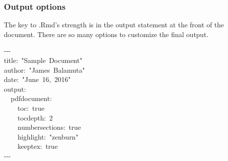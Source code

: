 \documentclass{beamer}\usepackage[]{graphicx}\usepackage[]{color}
\makeatletter
\newcommand{\hlnum}[1]{\textcolor[rgb]{0.686,0.059,0.569}{#1}}%
\newcommand{\hlstr}[1]{\textcolor[rgb]{0.192,0.494,0.8}{#1}}%
\newcommand{\hlopt}[1]{\textcolor[rgb]{0,0,0}{#1}}%
\newcommand{\hlstd}[1]{\textcolor[rgb]{0.345,0.345,0.345}{#1}}%
\newcommand{\hlkwc}[1]{\textcolor[rgb]{0.333,0.667,0.333}{#1}}%
\newenvironment{kframe}{%
 \def\at@end@of@kframe{}%
 \ifinner\ifhmode%
  \def\at@end@of@kframe{\end{minipage}}%
  \begin{minipage}{\columnwidth}%
 \fi\fi%
 \def\FrameCommand##1{\hskip\@totalleftmargin \hskip-\fboxsep
 \colorbox{shadecolor}{##1}\hskip-\fboxsep
     \hskip-\linewidth \hskip-\@totalleftmargin \hskip\columnwidth}%
 \MakeFramed {\advance\hsize-\width
   \@totalleftmargin\z@ \linewidth\hsize
   \@setminipage}}%
 {\par\unskip\endMakeFramed%
 \at@end@of@kframe}
\newenvironment{knitrout}{}{} %
\makeatother
\begin{document}
\begin{frame}[fragile]
\frametitle{Output options}
The key to .Rmd's strength is in the output statement  at the front of the document.
There are so many options to customize the final output. 
\begin{knitrout}
\color{fgcolor}\begin{kframe}
\noindent
\ttfamily
\hlstd{}\hlopt{{-}{-}{-}}\hspace*{\fill}\\
\hlstd{title}\hlopt{:\ }\hlstd{}\hlstr{"Sample\ Document"}\hlstd{\hspace*{\fill}\\
author}\hlopt{:\ }\hlstd{}\hlstr{"James\ Balamuta"}\hlstd{}\hspace*{\fill}\\
\hlkwc{date}\hlstd{}\hlopt{:\ }\hlstd{}\hlstr{"June\ 16,\ 2016"}\hlstd{\hspace*{\fill}\\
output}\hlopt{:}\hspace*{\fill}\\
\hlstd{}\hlstd{\ \ }\hlstd{pdf\textunderscore document}\hlopt{:}\hspace*{\fill}\\
\hlstd{}\hlstd{\ \ \ \ }\hlstd{toc}\hlopt{:\ }\hlstd{true}\hlstd{\ \ \ \ \ \ \ \ \ \ \ \ \ }\hlstd{}\hspace*{\fill}\\
\hlstd{}\hlstd{\ \ \ \ }\hlstd{toc\textunderscore depth}\hlopt{:\ }\hlstd{}\hlnum{2}\hlstd{\ \ \ \ \ \ \ \ \ \ }\hlnum{}\hlstd{}\hspace*{\fill}\\
\hlstd{}\hlstd{\ \ \ \ }\hlstd{number\textunderscore sections}\hlopt{:\ }\hlstd{true\ }\hspace*{\fill}\\
\hlstd{}\hlstd{\ \ \ \ }\hlstd{highlight}\hlopt{:\ }\hlstd{}\hlstr{"zenburn"}\hlstd{}\hlstd{\ \ }\hlstd{}\hspace*{\fill}\\
\hlstd{}\hlstd{\ \ \ \ }\hlstd{keep\textunderscore tex}\hlopt{:\ }\hlstd{true}\hlstd{\ \ \ \ \ \ \ \ }\hlstd{}\hspace*{\fill}\\
\hlstd{}\hlopt{{-}{-}{-}}\hlstd{}\hspace*{\fill}
\mbox{}
\normalfont
\end{kframe}
\end{knitrout}
\end{frame}
\end{document}
